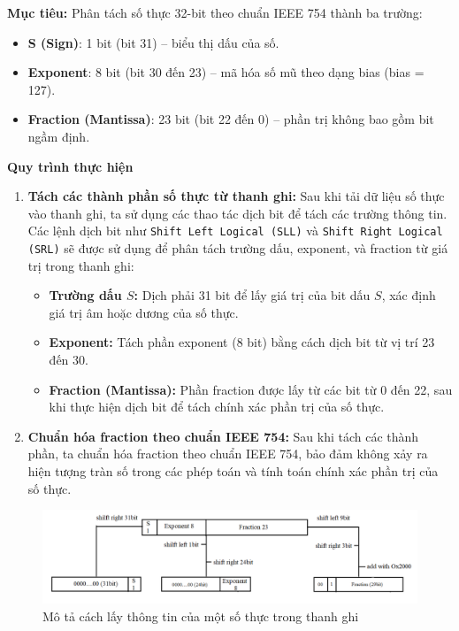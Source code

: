 \textbf{Mục tiêu:} Phân tách số thực 32-bit theo chuẩn IEEE 754 thành ba trường:
\begin{itemize}
    \item \textbf{S (Sign)}: 1 bit (bit 31) -- biểu thị dấu của số.
    \item \textbf{Exponent}: 8 bit (bit 30 đến 23) -- mã hóa số mũ theo dạng bias (bias = 127).
    \item \textbf{Fraction (Mantissa)}: 23 bit (bit 22 đến 0) -- phần trị không bao gồm bit ngầm định.
\end{itemize}
\textbf{Quy trình thực hiện}
\begin{enumerate}
    \item \textbf{Tách các thành phần số thực từ thanh ghi:}  
    Sau khi tải dữ liệu số thực vào thanh ghi, ta sử dụng các thao tác dịch bit để tách các trường thông tin. Các lệnh dịch bit như \texttt{Shift Left Logical (SLL)} và \texttt{Shift Right Logical (SRL)} sẽ được sử dụng để phân tách trường dấu, exponent, và fraction từ giá trị trong thanh ghi:
    \begin{itemize}
        \item \textbf{Trường dấu \( S \):} Dịch phải 31 bit để lấy giá trị của bit dấu \( S \), xác định giá trị âm hoặc dương của số thực.
        \item \textbf{Exponent:} Tách phần exponent (8 bit) bằng cách dịch bit từ vị trí 23 đến 30.
        \item \textbf{Fraction (Mantissa):} Phần fraction được lấy từ các bit từ 0 đến 22, sau khi thực hiện dịch bit để tách chính xác phần trị của số thực.
    \end{itemize}
    
    \item \textbf{Chuẩn hóa fraction theo chuẩn IEEE 754:}  
    Sau khi tách các thành phần, ta chuẩn hóa fraction theo chuẩn IEEE 754, bảo đảm không xảy ra hiện tượng tràn số trong các phép toán và tính toán chính xác phần trị của số thực.
\end{enumerate}
\begin{figure}[!h]
    \centering 
    \includegraphics[width=1\textwidth]{image/Mô tả cách lấy thông tin của một số thực trong thanh ghi.png}
         \vspace{0.5cm}
    \caption{Mô tả cách lấy thông tin của một số thực trong thanh ghi}
\end{figure}
\vspace{0.5em}

